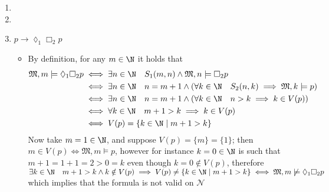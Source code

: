 \documentclass[a4paper, 12pt]{report}
\begin{document}
{\begin{enumerate}[label=(\alph*)]
\begin{itemize}
\begin{equation*}
\begin{split}
                                                                               &\iff m + 1 \in V(p) \cap V(q)
                            \end{split}
                        \end{equation*}
                        from which we conclude that $$\mathfrak M, m \models \lozenge_1 p \land \lozenge_1 q \iff m + 1 \in V(p) \cap V(q) \iff \mathfrak M, m \models \lozenge_1(p \land q)$$ implying that the formula is valid on $\mathcal N$.
                \end{itemize}
            \item
            \item 
            \item $p \rightarrow \lozenge_1 \Box_2 p$

                \begin{itemize}
                    \item By definition, for any $m \in \N$ it holds that
                        \begin{equation*}
                            \begin{split}
                                \mathfrak M, m \models \lozenge_1 \Box_2 p &\iff \exists n \in \N \quad S_1(m, n) \land \mathfrak M, n \models \Box_2 p \\
                                                                           &\iff \exists n \in \N \quad n = m + 1 \land (\forall k \in \N \quad S_2(n, k) \implies \mathfrak M, k \models p) \\
                                                                           &\iff \exists n \in \N \quad n = m + 1 \land (\forall k \in \N \quad n > k \implies k \in V(p)) \\
                                                                           &\iff \forall k \in \N \quad m + 1 > k \implies k \in V(p) \\
                                                                           &\iff V(p) = \{k \in \N \mid m + 1 > k\}
                            \end{split}
                        \end{equation*}
                        Now take $m = 1 \in \N$, and suppose $V(p) = \{m\} = \{1\}$; then $m \in V(p) \iff \mathfrak M, m \models p$, however for instance $k = 0 \in \N$ is such that $m + 1 = 1 + 1 = 2 > 0 = k$ even though $k = 0 \notin V(p)$, therefore $\exists k \in \N \quad m + 1 > k \land k \notin V(p) \implies V(p) \neq \{k \in \N \mid m + 1 > k\} \iff \mathfrak M, m \not\models \lozenge_1 \Box_2 p$ which implies that the formula is not valid on $\mathcal N$

\end{itemize}
\end{enumerate}}
\end{document}
